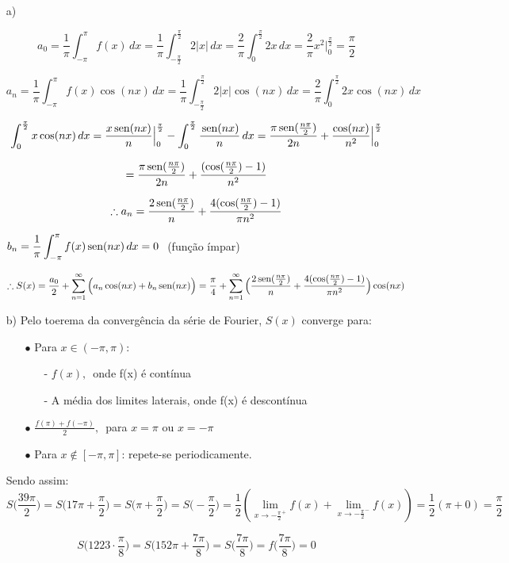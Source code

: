 \documentclass[12pt,a4paper]{article}
\newcommand{\sen}{\mbox{\,sen}}
\begin{document}
\begin{itemize}
\item[a)]

$$ a_0 = \frac{1}{\pi} \int_{-\pi}^\pi f(x) \, dx = \frac{1}{\pi} \int_{-\frac{\pi}{2}}^{\frac{\pi}{2}} 2 |x| \, dx = \frac{2}{\pi} \int_{0}^{\frac{\pi}{2}} 2 x \, dx = \frac{2}{\pi} x^2 \Big|_0^{\frac{\pi}{2}} = \frac{\pi}{2} $$

$$ a_n = \frac{1}{\pi} \int_{-\pi}^\pi f(x) \cos (n x) \, dx = \frac{1}{\pi} \int_{-\frac{\pi}{2}}^{\frac{\pi}{2}} 2 |x| \cos (n x) \, dx = \frac{2}{\pi} \int_{0}^{\frac{\pi}{2}} 2 x \cos (n x) \, dx $$

$$ \int_{0}^{\frac{\pi}{2}}  x \cos (n x) \, dx =  \frac{x \sen (nx)}{n} \Big|_0^\frac{\pi}{2} -  \int_{0}^{\frac{\pi}{2}} \frac{\sen(nx)}{n} \,dx = \frac{\pi \sen( \frac{n \pi}{2})}{2 n} + \frac{\cos (nx)}{n^2} \Big|_0^\frac{\pi}{2}    $$

$$ = \frac{\pi \sen( \frac{n \pi}{2})}{2 n} + \frac{ ( \cos (\frac{n \pi}{2}) -1)}{n^2} $$

$$ \therefore a_n =  \frac{ 2 \sen( \frac{n \pi}{2})}{ n} +  \frac{ 4 ( \cos (\frac{n \pi}{2}) -1)}{\pi n^2} $$

\begin{center}
$b_n = \displaystyle\frac{1}{\pi} \displaystyle\int_{-\pi}^\pi f(x) \sen (n x) \, dx = 0 \,\,$ (função ímpar)
\end{center}

$$ \therefore S(x) = \frac{a_0}{2} + \sum_{n=1}^\infty \Big( a_n \cos(nx) + b_n \sen(nx) \Big) = \frac{\pi}{4} + \sum_{n=1}^\infty \Big( \frac{ 2 \sen( \frac{n \pi}{2})}{ n} +  \frac{ 4 ( \cos (\frac{n \pi}{2}) -1)}{\pi n^2} \Big) \cos (nx) $$

\item[b)] Pelo toerema da convergência da série de Fourier, $S(x)$ converge para:

\begin{itemize}
\item[$\bullet$] Para $x \in  (-\pi,\pi)$:
	\begin{itemize}
	\item[-] $f(x), \,$ onde f(x) é contínua
	\item[-] A média dos limites laterais, onde f(x) é descontínua
	\end{itemize}
\item[$\bullet$] $\displaystyle\frac{f(\pi)+f(-\pi)}{2}, \, $ para $ x = \pi $ ou $ x = -\pi $ 
\item[$\bullet$] Para $x \notin [ -\pi,\pi]$: repete-se periodicamente.
\end{itemize}

Sendo assim:
$$ S\Big(\frac{39 \pi}{2}\Big) = S\Big(17\pi + \frac{\pi}{2}\Big) = S\Big(\pi + \frac{\pi}{2}\Big) = S\Big(- \frac{\pi}{2}\Big) = \frac{1}{2} ( \lim_{x \rightarrow - \frac{\pi}{2}^+ } f(x) + \lim_{x \rightarrow - \frac{\pi}{2}^- } f(x) ) = \frac{1}{2} ( \pi + 0) = \frac{\pi}{2} $$

$$ S\Big(1223 \cdot \frac{\pi}{8}\Big) = S\Big(152\pi + \frac{7 \pi}{8}\Big) = S\Big(\frac{7\pi}{8}\Big) = f\Big(\frac{7\pi}{8}\Big) = 0 $$

\end{itemize}
\end{document}
